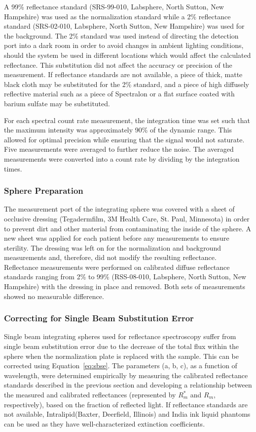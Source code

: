 A 99\% reflectance standard (SRS-99-010, Labsphere, North Sutton, New Hampshire) was used as the normalization standard while a 2\% reflectance standard (SRS-02-010, Labsphere, North Sutton, New Hampshire) was used for the background. The 2\% standard was used instead of directing the detection port into a dark room in order to avoid changes in ambient lighting conditions, should the system be used in different locations which would affect the calculated reflectance. This substitution did not affect the accuracy or precision of the measurement. If reflectance standards are not available, a piece of thick, matte black cloth may be substituted for the 2\% standard, and a piece of high diffusely reflective material such as a piece of Spectralon or a flat surface coated with barium sulfate may be substituted.

For each spectral count rate measurement, the integration time was set such that the maximum intensity was approximately 90\% of the dynamic range. This allowed for optimal precision while ensuring that the signal would not saturate. Five measurements were averaged to further reduce the noise. The averaged measurements were converted into a count rate by dividing by the integration times.

\subsubsection{Sphere Preparation}
The measurement port of the integrating sphere was covered with a sheet of occlusive dressing (Tegaderm\texttrademark film, 3M Health Care, St. Paul, Minnesota) in order to prevent dirt and other material from contaminating the inside of the sphere. A new sheet was applied for each patient before any measurements to ensure sterility. The dressing was left on for the normalization and background measurements and, therefore, did not modify the resulting reflectance. Reflectance measurements were performed on calibrated diffuse reflectance standards ranging from 2\% to 99\% (RSS-08-010, Labsphere, North Sutton, New Hampshire) with the dressing in place and removed. Both sets of measurements showed no measurable difference.

\subsubsection{Correcting for Single Beam Substitution Error}
Single beam integrating spheres used for reflectance spectroscopy suffer from single beam substitution error\cite{Springsteen1998,Labspherec} due to the decrease of the total flux within the sphere when the normalization plate is replaced with the sample. This can be corrected using Equation~\ref{eq:sbse}. The parameters (a, b, c), as a function of wavelength, were determined empirically by measuring the calibrated reflectance standards described in the previous section and developing a relationship between the measured and calibrated reflectances (represented by $R_m^\ast$ and $R_m$, respectively), based on the fraction of reflected light. If reflectance standards are not available, Intralipid\texttrademark (Baxter, Deerfield, Illinois) and India ink liquid phantoms can be used as they have well-characterized extinction coefficients.\cite{Flock1992,Madsen1992}

